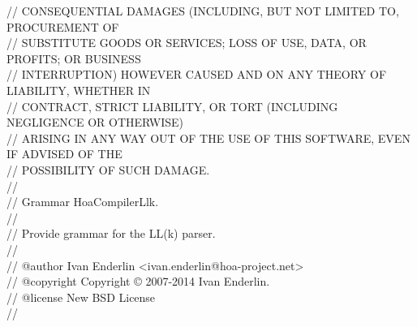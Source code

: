 \begin{bigbigpre}
// CONSEQUENTIAL DAMAGES (INCLUDING, BUT NOT LIMITED TO, PROCUREMENT OF \\
// SUBSTITUTE GOODS OR SERVICES; LOSS OF USE, DATA, OR PROFITS; OR BUSINESS \\
// INTERRUPTION) HOWEVER CAUSED AND ON ANY THEORY OF LIABILITY, WHETHER IN \\
// CONTRACT, STRICT LIABILITY, OR TORT (INCLUDING NEGLIGENCE OR OTHERWISE) \\
// ARISING IN ANY WAY OUT OF THE USE OF THIS SOFTWARE, EVEN IF ADVISED OF THE \\
// POSSIBILITY OF SUCH DAMAGE. \\
// \\
// Grammar \bslash{}Hoa\bslash{}Compiler\bslash{}Llk. \\
// \\
// Provide grammar for the LL(k) parser. \\
// \\
// @author     Ivan Enderlin <ivan.enderlin@hoa-project.net> \\
// @copyright  Copyright © 2007-2014 Ivan Enderlin. \\
// @license    New BSD License \\
// \\
 \\
 \\
 \\
 \\
 \\

\end{bigbigpre}
